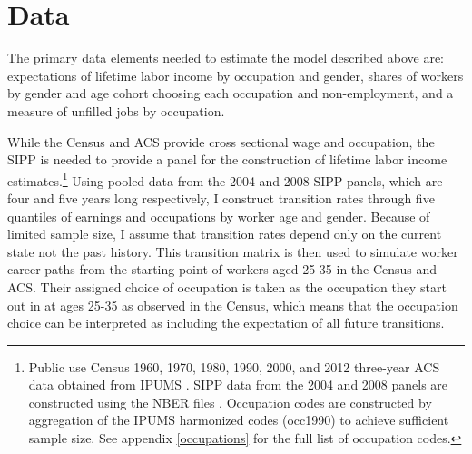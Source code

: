 \documentclass[12pt]{article}
\begin{document}

\section{Data} \label{data}
The primary data elements needed to estimate the model described above are: expectations of lifetime labor income by occupation and gender, shares of workers by gender and age cohort choosing each occupation and non-employment, and a measure of unfilled jobs by occupation.

While the Census and ACS provide cross sectional wage and occupation, the SIPP is needed to provide a panel for the construction of lifetime labor income estimates.\footnote{Public use Census 1960, 1970, 1980, 1990, 2000, and 2012 three-year ACS data obtained from IPUMS \cite{IPUMSUSA}. SIPP data from the 2004 and 2008 panels are constructed using the NBER files \cite{SIPP}. Occupation codes are constructed by aggregation of the IPUMS harmonized codes (occ1990) to achieve sufficient sample size. See appendix \ref{occupations} for the full list of occupation codes.} Using pooled data from the 2004 and 2008 SIPP panels, which are four and five years long respectively, I construct transition rates through five quantiles of earnings and occupations by worker age and gender. Because of limited sample size, I assume that transition rates depend only on the current state not the past history. This transition matrix is then used to simulate worker career paths from the starting point of workers aged 25-35 in the Census and ACS. Their assigned choice of occupation is taken as the occupation they start out in at ages 25-35 as observed in the Census, which means that the occupation choice can be interpreted as including the expectation of all future transitions.




\end{document}
